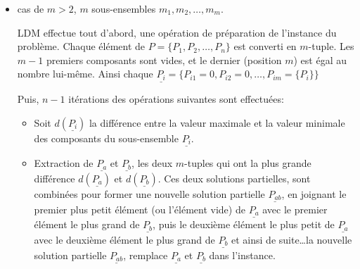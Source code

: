 \documentclass[a4paper,12pt]{report}
\theoremstyle{plain}				%
\newtheorem{example}{Exemple}
\theoremstyle{definition}				%
\begin{document}
\begin{itemize}
\begin{example}
\end{example}

\bigskip

\item cas de $m>2$, $m$ sous-ensembles $m_1,m_2, \ldots, m_m $.

%
%
  LDM effectue tout d'abord, une opération de préparation de
  l'instance du problème.
  Chaque élément de $P = \{ P_1, P_2, \ldots, P_n \}$ est converti en
  $m$-tuple.
  Les $m-1$ premiers composants sont vides, et le dernier (position $m$)
  est égal au nombre lui-même.
  Ainsi chaque
  $\underline{P_i} = \{P_{i 1}=0,P_{i 2}=0, \ldots, P_{i m}=\{P_i\}
  \}$

Puis, $n-1$ itérations des opérations suivantes sont effectuées:

\begin{itemize}
\item Soit $d(\underline{P_i})$ la différence entre la valeur maximale et la
valeur minimale des composants du sous-ensemble $\underline{P_i}$.

\item Extraction de $\underline{P_a}$ et $\underline{P_b}$, les deux $m$-tuples
qui ont la plus grande différence $d(\underline{P_a})$ et
$d(\underline{P_b})$.
Ces deux solutions partielles, sont combinées pour former une nouvelle
solution partielle $\underline{P_{ab}}$, en joignant le premier plus
petit élément (ou l'élément vide) de $\underline{P_a}$ avec le premier
élément le plus grand de $\underline{P_b}$, puis le deuxième élément
le plus petit de $\underline{P_a}$ avec le deuxième élément le plus
grand de $\underline{P_b}$ et ainsi de suite\ldots la nouvelle
solution partielle $\underline{P_{ab}}$, remplace $\underline{P_a}$ et
$\underline{P_b}$ dans l'instance.
\end{itemize}


\end{itemize}
\end{document}
